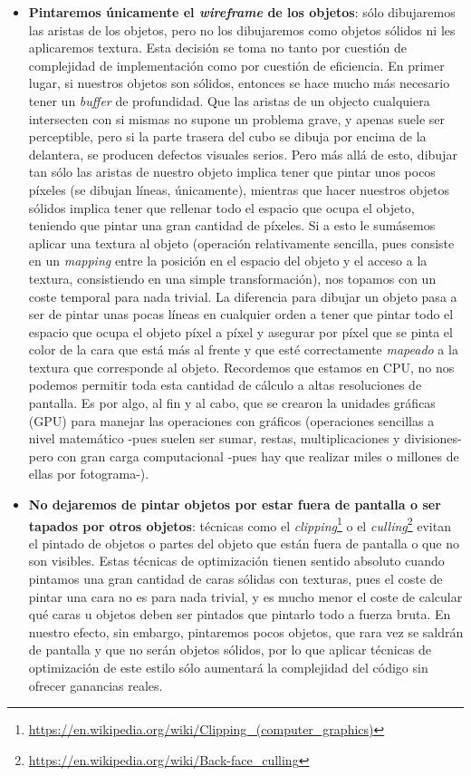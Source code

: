 \begin{itemize}
	\item \textbf{Pintaremos únicamente el \emph{wireframe} de los objetos}: sólo dibujaremos las aristas de los objetos, pero no los dibujaremos como objetos sólidos ni les aplicaremos textura. Esta decisión se toma no tanto por cuestión de complejidad de implementación como por cuestión de eficiencia. En primer lugar, si nuestros objetos son sólidos, entonces se hace mucho más necesario tener un \emph{buffer} de profundidad. Que las aristas de un objecto cualquiera intersecten con si mismas no supone un problema grave, y apenas suele ser perceptible, pero si la parte trasera del cubo se dibuja por encima de la delantera, se producen defectos visuales serios. Pero más allá de esto, dibujar tan sólo las aristas de nuestro objeto implica tener que pintar unos pocos píxeles (se dibujan líneas, únicamente), mientras que hacer nuestros objetos sólidos implica tener que rellenar todo el espacio que ocupa el objeto, teniendo que pintar una gran cantidad de píxeles. Si a esto le sumásemos aplicar una textura al objeto (operación relativamente sencilla, pues consiste en un \emph{mapping} entre la posición en el espacio del objeto y el acceso a la textura, consistiendo en una simple transformación), nos topamos con un coste temporal para nada trivial. La diferencia para dibujar un objeto pasa a ser de pintar unas pocas líneas en cualquier orden a tener que pintar todo el espacio que ocupa el objeto píxel a píxel y asegurar por píxel que se pinta el color de la cara que está más al frente y que esté correctamente \emph{mapeado} a la textura que corresponde al objeto. Recordemos que estamos en CPU, no nos podemos permitir toda esta cantidad de cálculo a altas resoluciones de pantalla. Es por algo, al fin y al cabo, que se crearon la unidades gráficas (GPU) para manejar las operaciones con gráficos (operaciones sencillas a nivel matemático -pues suelen ser sumar, restas, multiplicaciones y divisiones- pero con gran carga computacional -pues hay que realizar miles o millones de ellas por fotograma-).
	\item \textbf{No dejaremos de pintar objetos por estar fuera de pantalla o ser tapados por otros objetos}: técnicas como el \emph{clipping}\footnote{\url{https://en.wikipedia.org/wiki/Clipping_(computer_graphics)}} o el \emph{culling}\footnote{\url{https://en.wikipedia.org/wiki/Back-face_culling}} evitan el pintado de objetos o partes del objeto que están fuera de pantalla o que no son visibles. Estas técnicas de optimización tienen sentido absoluto cuando pintamos una gran cantidad de caras sólidas con texturas, pues el coste de pintar una cara no es para nada trivial, y es mucho menor el coste de calcular qué caras u objetos deben ser pintados que pintarlo todo a fuerza bruta. En nuestro efecto, sin embargo, pintaremos pocos objetos, que rara vez se saldrán de pantalla y que no serán objetos sólidos, por lo que aplicar técnicas de optimización de este estilo sólo aumentará la complejidad del código sin ofrecer ganancias reales.
\end{itemize}

